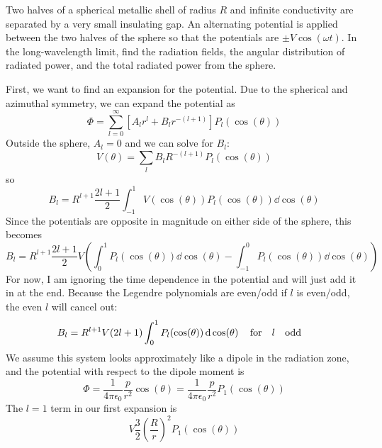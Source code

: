 \documentclass[a4paper,twoside]{article}
\begin{document}
Two halves of a spherical metallic shell of radius $ R $ and infinite conductivity are separated by a very small insulating gap. An alternating potential is applied between the two halves of the sphere so that the potentials are $ \pm V \cos(\omega t) $. In the long-wavelength limit, find the radiation fields, the angular distribution of radiated power, and the total radiated power from the sphere.
\begin{problem}
    First, we want to find an expansion for the potential. Due to the spherical and azimuthal symmetry, we can expand the potential as
    \begin{equation}
        \Phi = \sum_{l=0}^{\infty} \left[ A_l r^l + B_l r^{-(l+1)} \right] P_l(\cos(\theta))
    \end{equation}
    Outside the sphere, $ A_l = 0 $ and we can solve for $ B_l $:
    \begin{equation}
        V(\theta) = \sum_l B_l R^{-(l+1)} P_l(\cos(\theta))
    \end{equation}
    so
    \begin{equation}
        B_l = R^{l+1} \frac{2l+1}{2} \int_{-1}^{1} V(\cos(\theta)) P_l(\cos(\theta)) \dd{\cos(\theta)}
    \end{equation}
    Since the potentials are opposite in magnitude on either side of the sphere, this becomes
    \begin{equation}
        B_l = R^{l+1} \frac{2l+1}{2} V\left( \int_0^1 P_l(\cos(\theta)) \dd{\cos(\theta)} - \int_{-1}^{0} P_l(\cos(\theta)) \dd{\cos(\theta)} \right)
    \end{equation}
    For now, I am ignoring the time dependence in the potential and will just add it in at the end. Because the Legendre polynomials are even/odd if $ l $ is even/odd, the even $ l $ will cancel out:
    \begin{equation}
        B_l = R^{l+1} V (2l+1) \int_0^1 P_l(\cos(\theta)) \dd{\cos(\theta)} \qfor l \qodd
    \end{equation}
    We assume this system looks approximately like a dipole in the radiation zone, and the potential with respect to the dipole moment is
    \begin{equation}
        \Phi = \frac{1}{4 \pi \epsilon_0} \frac{p}{r^2} \cos(\theta) = \frac{1}{4 \pi \epsilon_0} \frac{p}{r^2} P_1(\cos(\theta))
    \end{equation}
    The $ l = 1 $ term in our first expansion is
    \begin{equation}
        V \frac{3}{2} \left( \frac{R}{r} \right)^2 P_1(\cos(\theta))

\end{equation}
\end{problem}
\end{document}
